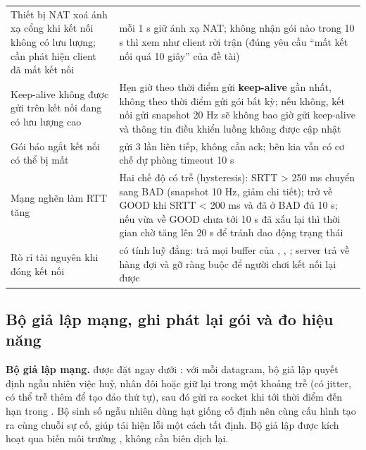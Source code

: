 \begin{center}\small
\begin{tabularx}{\linewidth}{|L{4.2cm}|Y|}
\hline
{} &  \\ \hline
Thiết bị NAT xoá ánh xạ cổng khi kết nối không có lưu lượng; cần phát hiện client đã mất kết nối &  mỗi 1 s giữ ánh xạ NAT; không nhận gói nào trong 10 s thì xem như client rời trận (đúng yêu cầu ``mất kết nối quá 10 giây'' của đề tài) \\ \hline
Keep-alive không được gửi trên kết nối đang có lưu lượng cao & Hẹn giờ theo thời điểm gửi \textbf{keep-alive} gần nhất, không theo thời điểm gửi gói bất kỳ; nếu không, kết nối gửi snapshot 20 Hz sẽ không bao giờ gửi keep-alive và thông tin điều khiển luồng không được cập nhật \\ \hline
Gói báo ngắt kết nối có thể bị mất &  gửi 3 lần liên tiếp, không cần ack; bên kia vẫn có cơ chế dự phòng timeout 10 s \\ \hline
Mạng nghẽn làm RTT tăng & Hai chế độ có trễ (hysteresis): SRTT > 250 ms chuyển sang BAD (snapshot 10 Hz, giảm chi tiết); trở về GOOD khi SRTT < 200 ms và đã ở BAD đủ 10 s; nếu vừa về GOOD chưa tới 10 s đã xấu lại thì thời gian chờ tăng lên 20 s để tránh dao động trạng thái \\ \hline
Rò rỉ tài nguyên khi đóng kết nối &  có tính luỹ đẳng: trả mọi buffer của , , ; server trả  về hàng đợi và gỡ ràng buộc  để người chơi kết nối lại được \\ \hline
\end{tabularx}
\end{center}

\subsection{Bộ giả lập mạng, ghi phát lại gói và đo hiệu năng}
\textbf{Bộ giả lập mạng.}  được đặt ngay dưới : với mỗi datagram, bộ giả lập
quyết định ngẫu nhiên việc huỷ, nhân đôi hoặc giữ lại trong một khoảng trễ (có jitter, có thể trễ thêm để tạo đảo thứ
tự), sau đó gửi ra socket khi tới thời điểm đến hạn trong . Bộ sinh số ngẫu nhiên dùng hạt giống cố định nên
cùng cấu hình tạo ra cùng chuỗi sự cố, giúp tái hiện lỗi một cách tất định. Bộ giả lập được kích hoạt qua biến môi
trường , không cần biên dịch lại.


